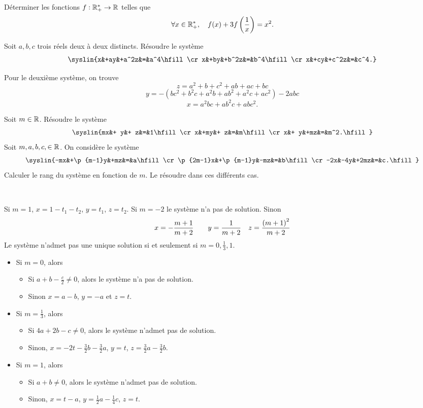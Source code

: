 \documentclass{magnolia}
\begin{document}
Déterminer les fonctions $f:\mathbb{R}_+^*\to\mathbb{R}$ telles que
\[\forall x\in\mathbb{R}_+^*,\quad f(x)+3f\left(\frac{1}{x}\right)=x^2.\]

Soit $a,b,c$ trois réels deux à deux distincts. Résoudre le système
  \[\syslin{x&+ay&+a^2z&=&a^4\hfill\cr
            x&+by&+b^2z&=&b^4\hfill\cr
            x&+cy&+c^2z&=&c^4.}\]
\begin{sol}
Pour le deuxième système, on trouve 
$$z=a^2+b+c^2+ab+ac+bc$$
$$y=-(bc^2+b^2c+a^2b+ab^2+a^2c+ac^2)-2abc$$
$$x=a^2bc+ab^2c+abc^2.$$
\end{sol}



\begin{questions}
\question Soit $m\in\mathbb{R}$. Résoudre le système
  \[\syslin{mx&+ y&+ z&=&1\hfill\cr
             x&+my&+ z&=&m\hfill\cr
             x&+ y&+mz&=&m^2.\hfill}\]
\question Soit $m,a,b,c,\in\mathbb{R}$. On considère le système
  \[\syslin{-mx&+\p{m-1}y&+mz&=&a\hfill\cr
            \p{2m-1}x&+\p{m-1}y&-mz&=&b\hfill\cr
            -2x&-4y&+2mz&=&c.\hfill}\]
  Calculer le rang du système en fonction de $m$. Le résoudre dans ces différents cas.
\end{questions}
\begin{sol}
$\quad$
\begin{questions}
\question Si $m=1$, $x=1-t_1-t_2$, $y=t_1$, $z=t_2$. Si $m=-2$ le système n'a
  pas de solution. Sinon
  \[x=-\frac{m+1}{m+2} \qquad y=\frac{1}{m+2} \quad z=\frac{\left(m+1\right)^2}{m+2}\]
\question Le système n'admet pas une unique solution si et seulement si
  $m=0,\frac{1}{3},1$.
  \begin{itemize}
  \item Si $m=0$, alors
    \begin{itemize}
    \item Si $a+b-\frac{c}{2}\neq 0$, alors le système n'a pas de solution.
    \item Sinon $x=a-b$, $y=-a$ et $z=t$.
    \end{itemize}
  \item Si $m=\frac{1}{3}$, alors
    \begin{itemize}
    \item Si $4a+2b-c\neq 0$, alors le système n'admet pas de solution.
    \item Sinon, $x=-2t-\frac{3}{2}b-\frac{3}{2}a$, $y=t$,
      $z=\frac{3}{2}a-\frac{3}{2}b$.
    \end{itemize}
  \item Si $m=1$, alors
    \begin{itemize}
    \item Si $a+b\neq 0$, alors le système n'admet pas de solution.
    \item Sinon, $x=t-a$, $y=\frac{1}{2}a-\frac{1}{4}c$, $z=t$.
    \end{itemize}
  \end{itemize}
\end{questions}
\end{sol}
\end{document}
